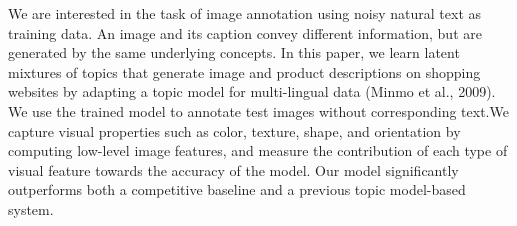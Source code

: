 We are interested in the task of image annotation using noisy natural text as training data. An image and its caption convey different information, but are
 generated by the same underlying concepts. In this paper, we learn latent
 mixtures of topics that generate image and product descriptions on shopping
 websites by adapting a topic model for multi-lingual data (Minmo et al., 2009).
 We use the trained model to annotate test images without corresponding text.We
 capture visual properties such as color, texture, shape, and orientation by
 computing low-level image features, and measure the contribution of each type
 of visual feature towards the accuracy of the model. Our model significantly
 outperforms both a competitive baseline and a previous topic model-based
 system.


